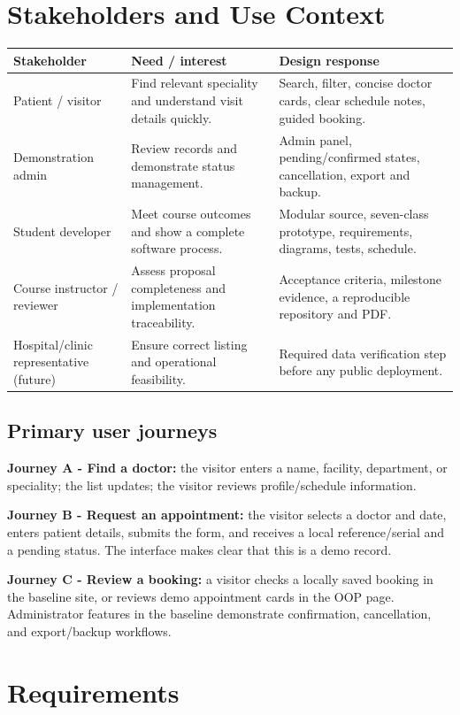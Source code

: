\documentclass[11pt,a4paper]{article}
\begin{document}
\section{Stakeholders and Use Context}
\begin{tabularx}{\textwidth}{p{3.0cm}p{4.0cm}X}
\toprule
\textbf{Stakeholder} & \textbf{Need / interest} & \textbf{Design response}\\\midrule
Patient / visitor & Find relevant speciality and understand visit details quickly. & Search, filter, concise doctor cards, clear schedule notes, guided booking.\\
Demonstration admin & Review records and demonstrate status management. & Admin panel, pending/confirmed states, cancellation, export and backup.\\
Student developer & Meet course outcomes and show a complete software process. & Modular source, seven-class prototype, requirements, diagrams, tests, schedule.\\
Course instructor / reviewer & Assess proposal completeness and implementation traceability. & Acceptance criteria, milestone evidence, a reproducible repository and PDF.\\
Hospital/clinic representative (future) & Ensure correct listing and operational feasibility. & Required data verification step before any public deployment.\\
\bottomrule
\end{tabularx}

\subsection{Primary user journeys}
\textbf{Journey A - Find a doctor:} the visitor enters a name, facility, department, or speciality; the list updates; the visitor reviews profile/schedule information.

\textbf{Journey B - Request an appointment:} the visitor selects a doctor and date, enters patient details, submits the form, and receives a local reference/serial and a pending status. The interface makes clear that this is a demo record.

\textbf{Journey C - Review a booking:} a visitor checks a locally saved booking in the baseline site, or reviews demo appointment cards in the OOP page. Administrator features in the baseline demonstrate confirmation, cancellation, and export/backup workflows.

\section{Requirements}
\end{document}
